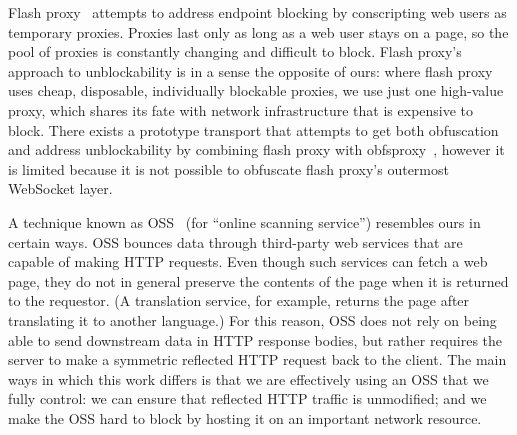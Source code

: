 \documentclass{article}
\begin{document}
Flash proxy~\cite{flashproxy} attempts to address endpoint blocking by
conscripting web users as temporary proxies. Proxies last only as long as a web
user stays on a page, so the pool of proxies is constantly changing and
difficult to block.
Flash proxy's approach to unblockability is in a sense
the opposite of ours: where flash proxy uses cheap, disposable, individually blockable proxies,
we use just one high-value proxy, which shares its fate with network
infrastructure that is expensive to block.
There exists a prototype transport that attempts to get both
obfuscation and address unblockability by combining flash proxy
with obfsproxy~\cite{obfs-flash}, however it is limited because it is not
possible to obfuscate flash proxy's outermost WebSocket layer.


A technique known as OSS~\cite{oss} (for
``online scanning service'') resembles ours in certain ways. OSS bounces data
through third-party web services that are capable of making HTTP requests.
Even though such services can fetch a web page, they do not in general
preserve the contents of the page when it is returned to the requestor.
(A translation service, for example,
returns the page after translating it to another language.)
For this reason, OSS does not rely on being able to send downstream data in HTTP response bodies,
but rather requires the server to make a symmetric reflected HTTP request back to the client.
The main ways in which this work differs is that we are effectively using an OSS that we fully control:
we can ensure that reflected HTTP traffic is unmodified;
and we make the OSS hard to block by hosting it on an important network resource.
\end{document}
